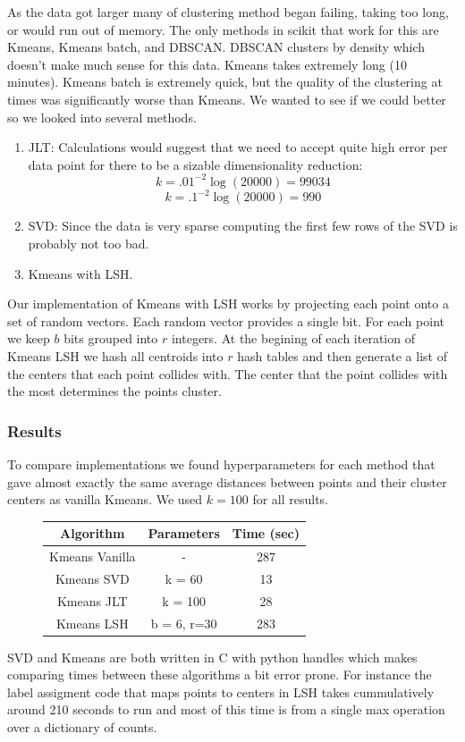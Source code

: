 \documentclass[12pt]{article}
\numberwithin{equation}{section}
\begin{document}
As the data got larger many of clustering method began failing, taking too long, or 
would run out of memory. The only methods in scikit that work for this are Kmeans, Kmeans batch, and DBSCAN. 
DBSCAN clusters by density which doesn't make much sense for this data. Kmeans takes extremely long (10 minutes). 
Kmeans batch is extremely quick, but the quality of the clustering at times was significantly worse than Kmeans. 
We wanted to see if we could better so we looked into several methods.
\begin{enumerate}
\item JLT: Calculations would suggest that we need to accept quite high error per data point for there to be a sizable dimensionality reduction:
 $$k = .01^{-2} \log(20000) = 99034$$
 $$k = .1^{-2} \log(20000) = 990$$
\item SVD: Since the data is very sparse computing the first few rows of the SVD is probably not too bad. 
\item Kmeans with LSH. 
\end{enumerate} 
Our implementation of Kmeans with LSH works by projecting each point onto a set of random vectors. Each random 
vector provides a single bit. For each point we keep $b$ bits grouped into $r$ integers. 
At the begining of each iteration of Kmeans LSH we hash all centroids into $r$ hash tables and then 
generate a list of the centers that each point collides with. The center that the point collides
with the most determines the points cluster. 

\subsubsection*{Results}
To compare implementations we found hyperparameters for each method that gave almost exactly the same 
 average distances between points and their cluster centers as vanilla Kmeans. We used $k = 100$ for all results. 
\begin{figure}[h!]
	\centering
	\begin{tabular}{|c|c|c|}
		\hline Algorithm & Parameters & Time (sec)\\ 
		\hline Kmeans Vanilla & - & 287 \\ 
		\hline Kmeans SVD & k = 60 & 13 \\ 
		\hline Kmeans JLT & k = 100 & 28 \\ 
		\hline Kmeans LSH & b = 6, r=30 & 283\\ 
		\hline 
	\end{tabular} 
\end{figure}
SVD and Kmeans are both written in C with python handles which makes comparing times between these algorithms a bit 
error prone. For instance the label assigment code that maps 
points to centers in LSH takes cummulatively around 210 seconds to run and most of this time is from a single max 
operation over a dictionary of counts. 
\end{document}
